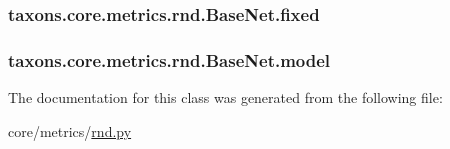 \subsubsection[{\texorpdfstring{fixed}{fixed}}]{\setlength{\rightskip}{0pt plus 5cm}taxons.\+core.\+metrics.\+rnd.\+Base\+Net.\+fixed}\hypertarget{classtaxons_1_1core_1_1metrics_1_1rnd_1_1_base_net_a5daef61f0b70960433a652ef1a3f725a}{}\label{classtaxons_1_1core_1_1metrics_1_1rnd_1_1_base_net_a5daef61f0b70960433a652ef1a3f725a}
\subsubsection[{\texorpdfstring{model}{model}}]{\setlength{\rightskip}{0pt plus 5cm}taxons.\+core.\+metrics.\+rnd.\+Base\+Net.\+model}\hypertarget{classtaxons_1_1core_1_1metrics_1_1rnd_1_1_base_net_a4b6490a67a58d6c7ce97dffcdf57c846}{}\label{classtaxons_1_1core_1_1metrics_1_1rnd_1_1_base_net_a4b6490a67a58d6c7ce97dffcdf57c846}


The documentation for this class was generated from the following file\+:\begin{DoxyCompactItemize}
\item 
core/metrics/\hyperlink{rnd_8py}{rnd.\+py}\end{DoxyCompactItemize}
